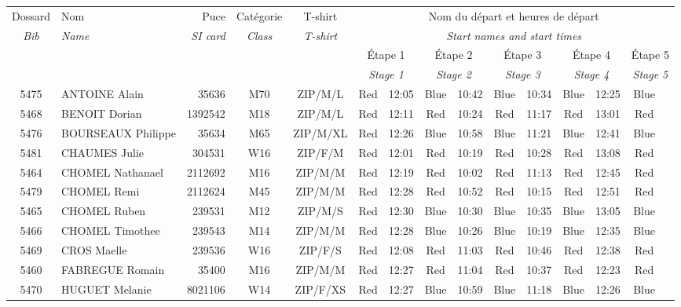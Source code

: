 \documentclass{report}
\begin{document}
  \begin{longtable}{|c|l|r|c|c|*{5}{cc|}}
    Dossard & Nom  & Puce    & Catégorie & T-shirt & \multicolumn{10}{c|}{Nom du départ et heures de départ} \\
    \itshape Bib     & \itshape Name & \itshape SI card & \itshape Class  & \itshape  T-shirt  & \multicolumn{10}{c|}{\itshape Start names and start times} \\
    \hline
    & & & & & \multicolumn{2}{c|}{Étape 1} & \multicolumn{2}{c|}{Étape 2} & \multicolumn{2}{c|}{Étape 3} & \multicolumn{2}{c|}{Étape 4} & \multicolumn{2}{c|}{Étape 5} \\
    & & & & & \multicolumn{2}{c|}{\itshape Stage 1} & \multicolumn{2}{c|}{\itshape Stage 2} & \multicolumn{2}{c|}{\itshape Stage 3} & \multicolumn{2}{c|}{\itshape Stage 4} & \multicolumn{2}{c|}{\itshape Stage 5} \\
    \hline
    5475 & ANTOINE Alain & 35636 & M70 & ZIP/M/L & Red & 12:05 & Blue & 10:42 & Blue & 10:34 & Blue & 12:25 & Blue &  \\
    5468 & BENOIT Dorian & 1392542 & M18 & ZIP/M/L & Red & 12:11 & Red & 10:24 & Red & 11:17 & Red & 13:01 & Red &  \\
    5476 & BOURSEAUX Philippe & 35634 & M65 & ZIP/M/XL & Red & 12:26 & Blue & 10:58 & Blue & 11:21 & Blue & 12:41 & Blue &  \\
    5481 & CHAUMES Julie & 304531 & W16 & ZIP/F/M & Red & 12:01 & Red & 10:19 & Red & 10:28 & Red & 13:08 & Red &  \\
    5464 & CHOMEL Nathanael & 2112692 & M16 & ZIP/M/M & Red & 12:19 & Red & 10:02 & Red & 11:13 & Red & 12:45 & Red &  \\
    5479 & CHOMEL Remi & 2112624 & M45 & ZIP/M/M & Red & 12:28 & Red & 10:52 & Red & 10:15 & Red & 12:51 & Red &  \\
    5465 & CHOMEL Ruben & 239531 & M12 & ZIP/M/S & Red & 12:30 & Blue & 10:30 & Blue & 10:35 & Blue & 13:05 & Blue &  \\
    5466 & CHOMEL Timothee & 239543 & M14 & ZIP/M/M & Red & 12:28 & Blue & 10:26 & Blue & 10:19 & Blue & 12:35 & Blue &  \\
    5469 & CROS Maelle & 239536 & W16 & ZIP/F/S & Red & 12:08 & Red & 11:03 & Red & 10:46 & Red & 12:38 & Red &  \\
    5460 & FABREGUE Romain & 35400 & M16 & ZIP/M/M & Red & 12:27 & Red & 11:04 & Red & 10:37 & Red & 12:23 & Red &  \\
    5470 & HUGUET Melanie & 8021106 & W14 & ZIP/F/XS & Red & 12:27 & Blue & 10:59 & Blue & 11:18 & Blue & 12:26 & Blue &  \\

\end{longtable}
\end{document}
